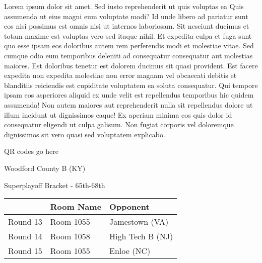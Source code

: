 \documentclass{article}%
\begin{document}
\vspace*{8pt}%
\linebreak%
\newline%
\newline%
Lorem ipsum dolor sit amet. Sed iusto reprehenderit ut quis voluptas ea Quis assumenda ut eius magni eum voluptate modi? Id unde libero ad pariatur sunt eos nisi possimus est omnis nisi ut internos laboriosam. Sit nesciunt ducimus et totam maxime est voluptas vero sed itaque nihil. Et expedita culpa et fuga sunt quo esse ipsam eos doloribus autem rem perferendis modi et molestiae vitae.\newline%
\newline%
Sed cumque odio eum temporibus deleniti ad consequatur consequatur aut molestias maiores. Est doloribus tenetur est dolorem ducimus sit quasi provident. Est facere expedita non expedita molestiae non error magnam vel obcaecati debitis et blanditiis reiciendis est cupiditate voluptatem ea soluta consequatur. Qui tempore ipsam eos asperiores aliquid ex unde velit est repellendus temporibus hic quidem assumenda!\newline%
\newline%
Non autem maiores aut reprehenderit nulla sit repellendus dolore ut illum incidunt ut dignissimos eaque! Ex aperiam minima eos quis dolor id consequatur eligendi ut culpa galisum. Non fugiat corporis vel doloremque dignissimos sit vero quasi sed voluptatem explicabo.\newline%
\newline%
%
\vspace*{30pt}%
\begin{center}%
\begin{Huge}%
QR codes go here%
\end{Huge}%
\end{center}%
\newpage%
\begin{center}%
\begin{Huge}%
Woodford County B (KY)%
\end{Huge}%
\vspace*{8pt}%
\linebreak%
\begin{Large}%
Superplayoff Bracket {-} 65th{-}68th%
\end{Large}%
\end{center}%
%
\begin{tabularx}{\textwidth}{|c|Y|Y|}%
\hline%
&Room Name&Opponent\\%
\hline%
Round 13&Room 1055&Jamestown (VA)\\%
Round 14&Room 1058&High Tech B (NJ)\\%
Round 15&Room 1055&Enloe (NC)\\%
\hline%
\end{tabularx}%
\end{document}
